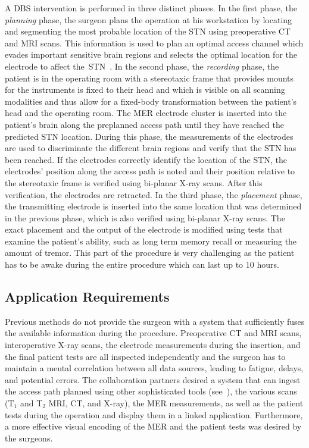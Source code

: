 A DBS intervention is performed in three distinct phases.  In the first phase, the \emph{planning} phase, the surgeon plans the operation at his workstation by locating and segmenting the most probable location of the STN using preoperative CT and MRI scans.  This information is used to plan an optimal access channel which evades important sensitive brain regions and selects the optimal location for the electrode to affect the~STN~\cite{butson2007patient}.  In the second phase, the \emph{recording} phase, the patient is in the operating room with a stereotaxic frame that provides mounts for the instruments is fixed to their head and which is visible on all scanning modalities and thus allow for a fixed-body transformation between the patient's head and the operating room.  The MER electrode cluster is inserted into the patient's brain along the preplanned access path until they have reached the predicted STN location.  During this phase, the measurements of the electrodes are used to discriminate the different brain regions and verify that the STN has been reached.  If the electrodes correctly identify the location of the STN, the electrodes' position along the access path is noted and their position relative to the stereotaxic frame is verified using bi-planar X-ray scans.  After this verification, the electrodes are retracted.  In the third phase, the \emph{placement} phase, the transmitting electrode is inserted into the same location that was determined in the previous phase, which is also verified using bi-planar X-ray scans.  The exact placement and the output of the electrode is modified using tests that examine the patient's ability, such as long term memory recall or measuring the amount of tremor.  This part of the procedure is very challenging as the patient has to be awake during the entire procedure which can last up to 10 hours.



\subsection{Application Requirements} \label{contributions:dbs:requirements}
Previous methods do not provide the surgeon with a system that sufficiently fuses the available information during the procedure.  Preoperative CT and MRI scans, interoperative X-ray scans, the electrode measurements during the insertion, and the final patient tests are all inspected independently and the surgeon has to maintain a mental correlation between all data sources, leading to fatigue, delays, and potential errors.  The collaboration partners desired a system that can ingest the access path planned using other sophisticated tools (see~), the various scans (T$_1$ and T$_2$ MRI, CT, and X-ray), the MER measurements, as well as the patient tests during the operation and display them in a linked application.  Furthermore, a more effective visual encoding of the MER and the patient tests was desired by the surgeons.

